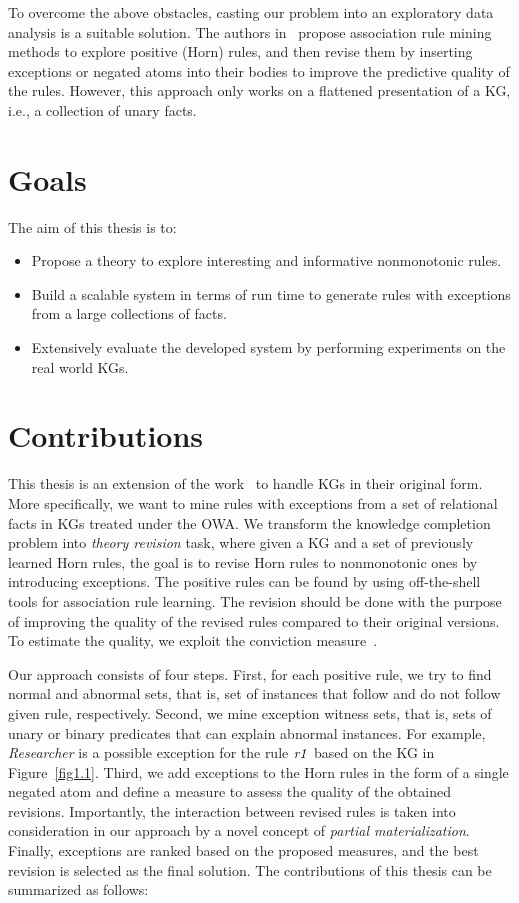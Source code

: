 To overcome the above obstacles, casting our problem into an exploratory data analysis is a suitable solution. The authors in~\cite{ref12} propose association rule mining methods to explore positive (Horn) rules, and then revise them by inserting exceptions or negated atoms into their bodies to improve the predictive quality of the rules. However, this approach only works on a flattened presentation of a KG, i.e., a collection of unary facts.

\section{Goals}

The aim of this thesis is to:
\begin{itemize}
\item Propose a theory to explore interesting and informative nonmonotonic rules.
\item Build a scalable system in terms of run time to generate rules with exceptions from a large collections of facts.
\item Extensively evaluate the developed system by performing experiments on the real world KGs.
\end{itemize}

\section{Contributions}

This thesis is an extension of the work~\cite{ref12} to handle KGs in their original form. More specifically, we want to mine rules with exceptions from a set of relational facts in KGs treated under the OWA. We transform the knowledge completion problem into \textit{theory revision} task, where given a KG and a set of previously learned Horn rules, the goal is to revise Horn rules to nonmonotonic ones by introducing exceptions. The positive rules can be found by using off-the-shell tools for association rule learning. The revision should be done with the purpose of improving the quality of the revised rules compared to their original versions. To estimate the quality, we exploit the conviction measure~\cite{ref48}.

Our approach consists of four steps. First, for each positive rule, we try to find normal and abnormal sets, that is, set of instances that follow and do not follow given rule, respectively. Second, we mine exception witness sets, that is, sets of unary or binary predicates that can explain abnormal instances. For example, \textit{Researcher} is a possible exception for the rule $\mathit{r1}$ based on the KG in Figure~\ref{fig1.1}. Third, we add exceptions to the Horn rules in the form of a single negated atom and define a measure to assess the quality of the obtained revisions. Importantly, the interaction between revised rules is taken into consideration in our approach by a novel concept of \textit{partial materialization}. Finally, exceptions are ranked based on the proposed measures, and the best revision is selected as the final solution. The contributions of this thesis can be summarized as follows:

